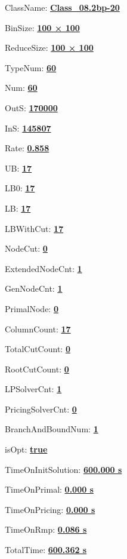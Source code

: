 \documentclass[11pt]{article}
\begin{document}
\pagestyle{empty}


ClassName: \underline{\textbf{Class_08.2bp-20}}
\par
BinSize: \underline{\textbf{100 × 100}}
\par
ReduceSize: \underline{\textbf{100 × 100}}
\par
TypeNum: \underline{\textbf{60}}
\par
Num: \underline{\textbf{60}}
\par
OutS: \underline{\textbf{170000}}
\par
InS: \underline{\textbf{145807}}
\par
Rate: \underline{\textbf{0.858}}
\par
UB: \underline{\textbf{17}}
\par
LB0: \underline{\textbf{17}}
\par
LB: \underline{\textbf{17}}
\par
LBWithCut: \underline{\textbf{17}}
\par
NodeCut: \underline{\textbf{0}}
\par
ExtendedNodeCnt: \underline{\textbf{1}}
\par
GenNodeCnt: \underline{\textbf{1}}
\par
PrimalNode: \underline{\textbf{0}}
\par
ColumnCount: \underline{\textbf{17}}
\par
TotalCutCount: \underline{\textbf{0}}
\par
RootCutCount: \underline{\textbf{0}}
\par
LPSolverCnt: \underline{\textbf{1}}
\par
PricingSolverCnt: \underline{\textbf{0}}
\par
BranchAndBoundNum: \underline{\textbf{1}}
\par
isOpt: \underline{\textbf{true}}
\par
TimeOnInitSolution: \underline{\textbf{600.000 s}}
\par
TimeOnPrimal: \underline{\textbf{0.000 s}}
\par
TimeOnPricing: \underline{\textbf{0.000 s}}
\par
TimeOnRmp: \underline{\textbf{0.086 s}}
\par
TotalTime: \underline{\textbf{600.362 s}}
\par
\newpage


\end{document}
